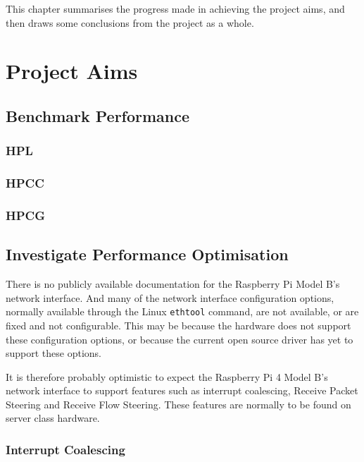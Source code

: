 This chapter summarises the progress made in achieving the project aims, and then draws some conclusions from the project as a whole.


%
%
\section{Project Aims}



%
%
\subsection{Benchmark Performance}

\subsubsection{HPL}


\subsubsection{HPCC}



\subsubsection{HPCG}


%
%
\subsection{Investigate Performance Optimisation}

There is no publicly available documentation for the Raspberry Pi Model B's network interface. And many of the network interface configuration options, normally available through the Linux \verb|ethtool| command, are not available, or are fixed and not configurable. This may be because the hardware does not support these configuration options, or because the current open source driver has yet to support these options.

It is therefore probably optimistic to expect the Raspberry Pi 4 Model B's network interface to support features such as interrupt coalescing, Receive Packet Steering and Receive Flow Steering. These features are normally to be found on server class hardware.

  


\subsubsection{Interrupt Coalescing}

